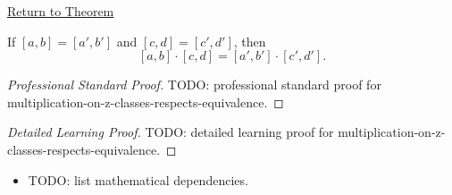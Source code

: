 \newpage
{}
\label{prf:multiplication-on-z-classes-respects-equivalence}

\begin{remark*}[Return]
\hyperref[lem:multiplication-on-z-classes-respects-equivalence]{Return to Theorem}
\end{remark*}

\begin{lemma*}
If $[a,b]=[a',b']$ and $[c,d]=[c',d']$, then
\[
[a,b]\cdot[c,d]=[a',b']\cdot[c',d'].
\]
\end{lemma*}

\begin{proof}[Professional Standard Proof]
\LRAProofBodyStart
TODO: professional standard proof for multiplication-on-z-classes-respects-equivalence.
\end{proof}

\begin{proof}[Detailed Learning Proof]
\LRAProofBodyStart
TODO: detailed learning proof for multiplication-on-z-classes-respects-equivalence.
\end{proof}

\begin{remark*}
\end{remark*}

\begin{dependencies}
\begin{itemize}
  \item TODO: list mathematical dependencies.
\end{itemize}
\end{dependencies}

\clearpage
